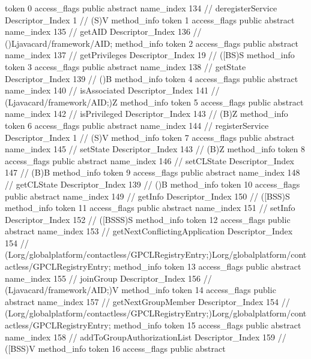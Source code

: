 {{{{{					token	0
					access_flags	public abstract
					name_index	134		// deregisterService
					Descriptor_Index	1		// (S)V
				}
				method_info {
					token	1
					access_flags	public abstract
					name_index	135		// getAID
					Descriptor_Index	136		// ()Ljavacard/framework/AID;
				}
				method_info {
					token	2
					access_flags	public abstract
					name_index	137		// getPrivileges
					Descriptor_Index	19		// ([BS)S
				}
				method_info {
					token	3
					access_flags	public abstract
					name_index	138		// getState
					Descriptor_Index	139		// ()B
				}
				method_info {
					token	4
					access_flags	public abstract
					name_index	140		// isAssociated
					Descriptor_Index	141		// (Ljavacard/framework/AID;)Z
				}
				method_info {
					token	5
					access_flags	public abstract
					name_index	142		// isPrivileged
					Descriptor_Index	143		// (B)Z
				}
				method_info {
					token	6
					access_flags	public abstract
					name_index	144		// registerService
					Descriptor_Index	1		// (S)V
				}
				method_info {
					token	7
					access_flags	public abstract
					name_index	145		// setState
					Descriptor_Index	143		// (B)Z
				}
				method_info {
					token	8
					access_flags	public abstract
					name_index	146		// setCLState
					Descriptor_Index	147		// (B)B
				}
				method_info {
					token	9
					access_flags	public abstract
					name_index	148		// getCLState
					Descriptor_Index	139		// ()B
				}
				method_info {
					token	10
					access_flags	public abstract
					name_index	149		// getInfo
					Descriptor_Index	150		// ([BSS)S
				}
				method_info {
					token	11
					access_flags	public abstract
					name_index	151		// setInfo
					Descriptor_Index	152		// ([BSSS)S
				}
				method_info {
					token	12
					access_flags	public abstract
					name_index	153		// getNextConflictingApplication
					Descriptor_Index	154		// (Lorg/globalplatform/contactless/GPCLRegistryEntry;)Lorg/globalplatform/contactless/GPCLRegistryEntry;
				}
				method_info {
					token	13
					access_flags	public abstract
					name_index	155		// joinGroup
					Descriptor_Index	156		// (Ljavacard/framework/AID;)V
				}
				method_info {
					token	14
					access_flags	public abstract
					name_index	157		// getNextGroupMember
					Descriptor_Index	154		// (Lorg/globalplatform/contactless/GPCLRegistryEntry;)Lorg/globalplatform/contactless/GPCLRegistryEntry;
				}
				method_info {
					token	15
					access_flags	public abstract
					name_index	158		// addToGroupAuthorizationList
					Descriptor_Index	159		// ([BSS)V
				}
				method_info {
					token	16
					access_flags	public abstract
}}}}}
